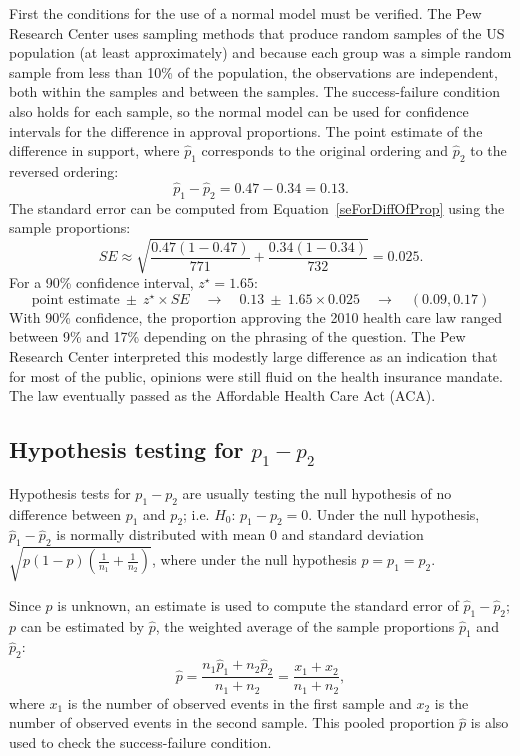 \begin{example}
{}
First the conditions for the use of a normal model must be verified. The Pew Research Center uses sampling methods that produce random samples of the US population (at least approximately) and because each group was a simple random sample from less than 10\% of the population, the observations are independent, both within the samples and between the samples. The success-failure condition also holds for each sample, so the normal model can be used for confidence intervals for the difference in approval proportions.  The point estimate of the difference in support, where $\hat{p}_1$ corresponds to the original ordering and $\hat{p}_2$ to the reversed ordering:
$$\hat{p}_{1} - \hat{p}_{2} = 0.47 - 0.34 = 0.13.$$
The standard error can be computed from Equation~\eqref{seForDiffOfProp} using the sample proportions:
$$SE \approx \sqrt{\frac{0.47(1-0.47)}{771} + \frac{0.34(1-0.34)}{732}} = 0.025.$$
For a 90\% confidence interval, $z^{\star} = 1.65$:
$$\text{point estimate} \ \pm\ z^{\star} \times SE \quad \to \quad 0.13 \ \pm\ 1.65 \times  0.025 \quad \to \quad (0.09, 0.17)$$
With 90\% confidence, the proportion approving the 2010 health care law ranged between 9\% and 17\% depending on the phrasing of the question. The Pew Research Center interpreted this modestly large difference as an indication that for most of the public, opinions were still fluid on the health insurance mandate.  The law eventually passed as the Affordable Health Care Act (ACA).
\end{example}


\subsection{Hypothesis testing for $p_1 -p_2$}

Hypothesis tests for $p_1 - p_2$ are usually testing the null hypothesis of no difference between $p_1$ and $p_2$; i.e. $H_0:\,p_1 - p_2 = 0$. Under the null hypothesis, $\hat{p}_1 - \hat{p}_2$ is normally distributed with mean 0 and standard deviation $\sqrt{p(1-p)(\frac{1}{n_1} + \frac{1}{n_2})}$, where under the null hypothesis $p = p_1 = p_2$.

Since $p$ is unknown, an estimate is used to compute the standard error of $\hat{p}_1 - \hat{p}_2$; $p$ can be estimated by $\hat{p}$, the weighted average of the sample proportions $\hat{p}_1$ and $\hat{p}_2$:
\[\hat{p} = \dfrac{n_{1}\hat{p}_1 + n_{2}\hat{p}_2}{n_{1} + n_{2}} = \dfrac{x_{1} + x_{2}}{n_{1} + n_{2}}, \]
where $x_1$ is the number of observed events in the first sample and $x_2$ is the number of observed events in the second sample. This pooled proportion $\hat{p}$ is also used to check the success-failure condition.

